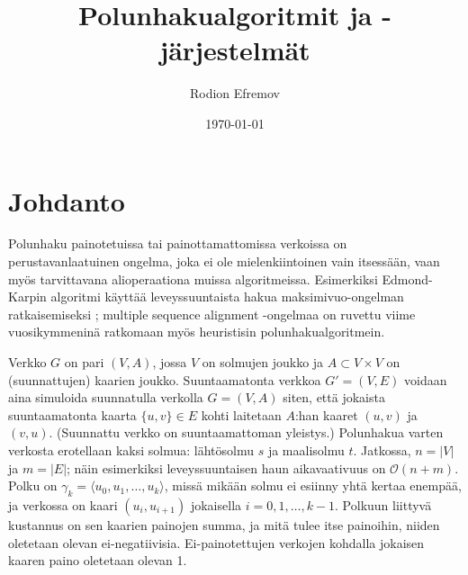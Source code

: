 \documentclass[finnish]{tktltiki2}
\title{Polunhakualgoritmit ja -järjestelmät}
\author{Rodion Efremov}
\date{\today}
\theoremstyle{definition}
\theoremstyle{remark}
\begin{document}

\frontmatter      %

\maketitle        %
\makeabstract     %

\tableofcontents  %


\mainmatter       %

\section{Johdanto}
Polunhaku painotetuissa tai painottamattomissa verkoissa on perustavanlaatuinen ongelma, joka ei ole mielenkiintoinen vain itsessään, vaan myös tarvittavana alioperaationa muissa algoritmeissa. Esimerkiksi Edmond-Karpin algoritmi käyttää leveyssuuntaista hakua maksimivuo-ongelman ratkaisemiseksi \cite{Cormen09}; multiple sequence alignment -ongelmaa on ruvettu viime vuosikymmeninä ratkomaan myös heuristisin polunhakualgoritmein.

Verkko $G$ on pari $(V, A)$, jossa $V$ on solmujen joukko ja $A \subset V \times V$ on (suunnattujen) kaarien joukko. Suuntaamatonta verkkoa $G' = (V, E)$ voidaan aina simuloida suunnatulla verkolla $G= (V, A)$ siten, että jokaista suuntaamatonta kaarta $\{ u, v \} \in E$ kohti laitetaan $A$:han kaaret $(u, v)$ ja $(v, u)$. (Suunnattu verkko on suuntaamattoman yleistys.) Polunhakua varten verkosta erotellaan kaksi solmua: lähtösolmu $s$ ja maalisolmu $t$. Jatkossa, $n = |V|$ ja $m = |E|$; näin esimerkiksi leveyssuuntaisen haun aikavaativuus on $\mathcal{O}(n + m)$. Polku on $\gamma_k = \langle u_0, u_1, \dots, u_k \rangle$, missä mikään solmu ei esiinny yhtä kertaa enempää, ja verkossa on kaari $(u_i, u_{i + 1})$ jokaisella $i = 0, 1, \dots, k - 1$. Polkuun liittyvä kustannus on sen kaarien painojen summa, ja mitä tulee itse painoihin, niiden oletetaan olevan ei-negatiivisia. Ei-painotettujen verkojen kohdalla jokaisen kaaren paino oletetaan olevan 1.

%
%
% 
%
\end{document}
